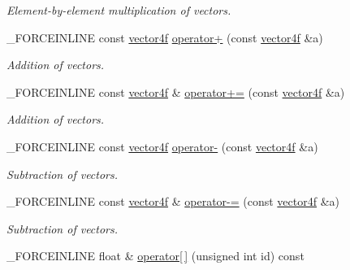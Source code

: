 \begin{DoxyCompactItemize}
\begin{DoxyCompactList}\small\item\em Element-\/by-\/element multiplication of vectors. \end{DoxyCompactList}\item 
\hypertarget{classbt_1_1vector4f_accc2a2aefe605d9ebb7e2f3106d6e955}{\-\_\-\-F\-O\-R\-C\-E\-I\-N\-L\-I\-N\-E const \hyperlink{classbt_1_1vector4f}{vector4f} \hyperlink{classbt_1_1vector4f_accc2a2aefe605d9ebb7e2f3106d6e955}{operator+} (const \hyperlink{classbt_1_1vector4f}{vector4f} \&a)}\label{classbt_1_1vector4f_accc2a2aefe605d9ebb7e2f3106d6e955}

\begin{DoxyCompactList}\small\item\em Addition of vectors. \end{DoxyCompactList}\item 
\hypertarget{classbt_1_1vector4f_a1f92ad81eeacd18d6d8d21ddaae50fd5}{\-\_\-\-F\-O\-R\-C\-E\-I\-N\-L\-I\-N\-E const \hyperlink{classbt_1_1vector4f}{vector4f} \& \hyperlink{classbt_1_1vector4f_a1f92ad81eeacd18d6d8d21ddaae50fd5}{operator+=} (const \hyperlink{classbt_1_1vector4f}{vector4f} \&a)}\label{classbt_1_1vector4f_a1f92ad81eeacd18d6d8d21ddaae50fd5}

\begin{DoxyCompactList}\small\item\em Addition of vectors. \end{DoxyCompactList}\item 
\hypertarget{classbt_1_1vector4f_abe4e3d038bea4cc1da6c8f70061abf1d}{\-\_\-\-F\-O\-R\-C\-E\-I\-N\-L\-I\-N\-E const \hyperlink{classbt_1_1vector4f}{vector4f} \hyperlink{classbt_1_1vector4f_abe4e3d038bea4cc1da6c8f70061abf1d}{operator-\/} (const \hyperlink{classbt_1_1vector4f}{vector4f} \&a)}\label{classbt_1_1vector4f_abe4e3d038bea4cc1da6c8f70061abf1d}

\begin{DoxyCompactList}\small\item\em Subtraction of vectors. \end{DoxyCompactList}\item 
\hypertarget{classbt_1_1vector4f_abf5f1ac39e157d0846f945057dcf16ff}{\-\_\-\-F\-O\-R\-C\-E\-I\-N\-L\-I\-N\-E const \hyperlink{classbt_1_1vector4f}{vector4f} \& \hyperlink{classbt_1_1vector4f_abf5f1ac39e157d0846f945057dcf16ff}{operator-\/=} (const \hyperlink{classbt_1_1vector4f}{vector4f} \&a)}\label{classbt_1_1vector4f_abf5f1ac39e157d0846f945057dcf16ff}

\begin{DoxyCompactList}\small\item\em Subtraction of vectors. \end{DoxyCompactList}\item 
\hypertarget{classbt_1_1vector4f_a6e068805641d9ee6ebee6cca5524943a}{\-\_\-\-F\-O\-R\-C\-E\-I\-N\-L\-I\-N\-E float \& \hyperlink{classbt_1_1vector4f_a6e068805641d9ee6ebee6cca5524943a}{operator\mbox{[}$\,$\mbox{]}} (unsigned int id) const }\label{classbt_1_1vector4f_a6e068805641d9ee6ebee6cca5524943a}


\end{DoxyCompactItemize}
